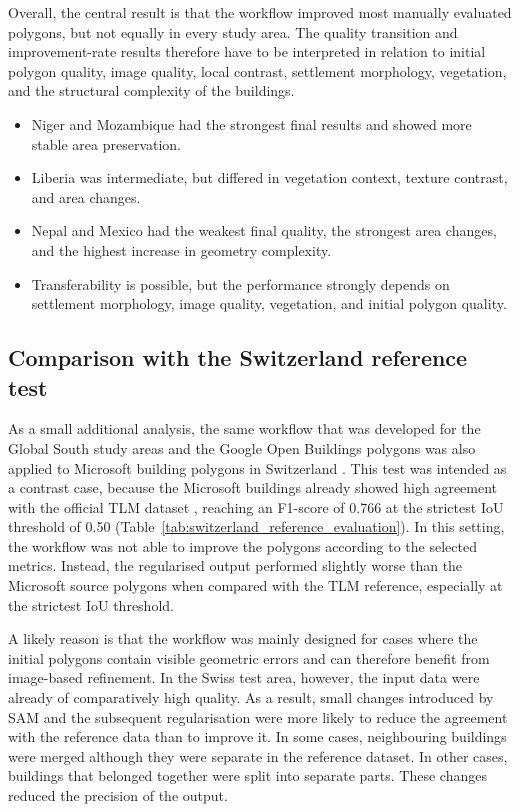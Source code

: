 Overall, the central result is that the workflow improved most manually evaluated polygons, but not equally in every study area. The quality transition and improvement-rate results therefore have to be interpreted in relation to initial polygon quality, image quality, local contrast, settlement morphology, vegetation, and the structural complexity of the buildings.

\begin{itemize}
    \item Niger and Mozambique had the strongest final results and showed more stable area preservation.
    \item Liberia was intermediate, but differed in vegetation context, texture contrast, and area changes.
    \item Nepal and Mexico had the weakest final quality, the strongest area changes, and the highest increase in geometry complexity.
    \item Transferability is possible, but the performance strongly depends on settlement morphology, image quality, vegetation, and initial polygon quality.
\end{itemize}

\subsection{Comparison with the Switzerland reference test}

As a small additional analysis, the same workflow that was developed for the Global South study areas and the Google Open Buildings polygons was also applied to Microsoft building polygons in Switzerland \citep{microsoft_globalmlbuildingfootprints}. This test was intended as a contrast case, because the Microsoft buildings already showed high agreement with the official TLM dataset \citep{swisstopo_swisstlm3d}, reaching an F1-score of 0.766 at the strictest IoU threshold of 0.50 (Table~\ref{tab:switzerland_reference_evaluation}). In this setting, the workflow was not able to improve the polygons according to the selected metrics. Instead, the regularised output performed slightly worse than the Microsoft source polygons when compared with the TLM reference, especially at the strictest IoU threshold.

A likely reason is that the workflow was mainly designed for cases where the initial polygons contain visible geometric errors and can therefore benefit from image-based refinement. In the Swiss test area, however, the input data were already of comparatively high quality. As a result, small changes introduced by SAM and the subsequent regularisation were more likely to reduce the agreement with the reference data than to improve it. In some cases, neighbouring buildings were merged although they were separate in the reference dataset. In other cases, buildings that belonged together were split into separate parts. These changes reduced the precision of the output.

